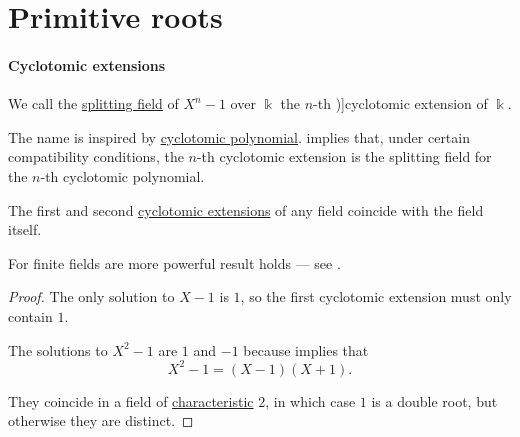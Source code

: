 \section{Primitive roots}\label{sec:primitive_elements}

\paragraph{Cyclotomic extensions}

\begin{definition}\label{def:cyclotomic_extension}
  We call the \hyperref[def:splitting_field]{splitting field} of \( X^n - 1 \) over \( \Bbbk \) the \( n \)-th \term[ru=круговое / циклотомическое (поле разложения) (\cite[204]{Кострикин2001АлгебраТом3})]{cyclotomic extension} of \( \Bbbk \).
\end{definition}
\begin{comments}
  \item The name is inspired by \hyperref[def:cyclotomic_polynomial]{cyclotomic polynomial}.  implies that, under certain compatibility conditions, the \( n \)-th cyclotomic extension is the splitting field for the \( n \)-th cyclotomic polynomial.
\end{comments}

\begin{proposition}\label{thm:small_cyclotomic_extensions}
  The first and second \hyperref[def:cyclotomic_extension]{cyclotomic extensions} of any field coincide with the field itself.
\end{proposition}
\begin{comments}
  \item For finite fields are more powerful result holds --- see .
\end{comments}
\begin{proof}
  The only solution to \( X - 1 \) is \( 1 \), so the first cyclotomic extension must only contain \( 1 \).

  The solutions to \( X^2 - 1 \) are \( 1 \) and \( -1 \) because  implies that
  \begin{equation*}
    X^2 - 1 = (X - 1)(X + 1).
  \end{equation*}

  They coincide in a field of \hyperref[def:ring_characteristic]{characteristic} \( 2 \), in which case \( 1 \) is a double root, but otherwise they are distinct.
\end{proof}

